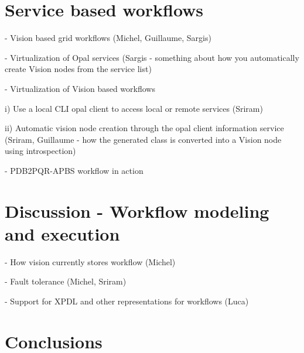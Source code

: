 \documentclass[conference]{IEEEtran}
\begin{document}
\section {Service based workflows}

- Vision based grid workflows (Michel, Guillaume, Sargis)

- Virtualization of Opal services (Sargis - something about how you
automatically create Vision nodes from the service list)

- Virtualization of Vision based workflows

  i) Use a local CLI opal client to access local or remote services (Sriram)

 ii) Automatic vision node creation through the opal client information
 service (Sriram, Guillaume - how the generated class is converted into a Vision node using introspection)

- PDB2PQR-APBS workflow in action

\section {Discussion - Workflow modeling and execution}

- How vision currently stores workflow (Michel)

- Fault tolerance (Michel, Sriram)

- Support for XPDL and other representations for workflows (Luca)

\section {Conclusions}
\end{document}
